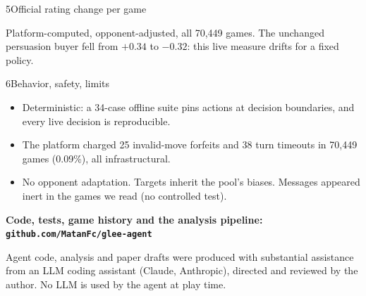 \documentclass[10pt]{article}
\newcommand{\smallsize}{\fontsize{6.9}{8.9}\selectfont}
\begin{document}
{\begin{minipage}[t][295.3mm][t]{207.8mm}
\begin{minipage}[t]{0.485\linewidth}
\begin{panel}{5\quad Official rating change per game}
\vspace{1.3mm}\raggedright\color{muted}
Platform-computed, opponent-adjusted, all 70{,}449 games. The unchanged
persuasion buyer fell from $+0.34$ to $-0.32$: this live measure drifts for a
fixed policy.
\end{panel}

\begin{panel}{6\quad Behavior, safety, limits}
\begin{itemize}
  \item Deterministic: a 34-case offline suite pins actions at decision
        boundaries, and every live decision is reproducible.
  \item The platform charged 25 invalid-move forfeits and 38 turn timeouts in
        70{,}449 games (0.09\%), all infrastructural.
  \item No opponent adaptation. Targets inherit the pool's biases. Messages
        appeared inert in the games we read (no controlled test).
\end{itemize}
\end{panel}

\end{minipage}

\vfill
\begin{tcolorbox}[enhanced, colback=white, colframe=rule, boxrule=0.4pt, arc=1.6mm,
  left=3.5mm, right=3.5mm, top=1.8mm, bottom=1.8mm, after skip=0mm]
\begin{minipage}[c]{0.84\linewidth}\raggedright
  {\fontsize{9.6}{12}\selectfont\bfseries\color{navy}
    Code, tests, game history and the analysis pipeline:\enspace
    \texttt{github.com/MatanFc/glee-agent}\par}
  \vspace{1.1mm}
  {\smallsize\color{muted} Agent code, analysis and paper drafts were produced
    with substantial assistance from an LLM coding assistant (Claude,
    Anthropic), directed and reviewed by the author. No LLM is used by the
    agent at play time.\par}
\end{minipage}\hfill
\begin{minipage}[c]{0.12\linewidth}\raggedleft
\end{minipage}
\end{tcolorbox}

\end{minipage}}
\end{document}
